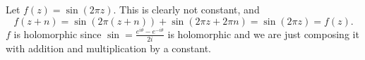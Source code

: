 \documentclass{homework}
\begin{document}
                                                                                                                                                                                                                                                                                              \begin{solution}
                                                                                                                                                                                                                                                                                              Let $f(z) = \sin(2\pi z)$. This is clearly not constant, and
                                                                                                                                                                                                                                                                                              \[
                                                                                                                                                                                                                                                                                              f(z+n) = \sin(2\pi (z + n)) + \sin(2\pi z + 2\pi n) = \sin(2\pi z) = f(z) .
                                                                                                                                                                                                                                                                                              \]
                                                                                                                                                                                                                                                                                              $f$ is holomorphic since $\sin = \frac{e^{i\theta} - e^{-i\theta}}{2i}$ is holomorphic and we are just composing it with addition and multiplication by a constant.
                                                                                                                                                                                                                                                                                              \end{solution}
\end{document}
